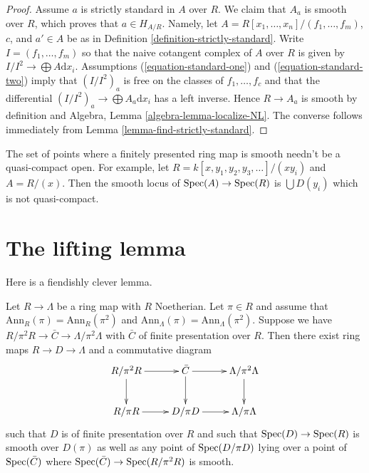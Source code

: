 \begin{proof}
Assume $a$ is strictly standard in $A$ over $R$. We claim that
$A_a$ is smooth over $R$, which proves that $a \in H_{A/R}$. Namely,
let $A = R[x_1, \ldots, x_n]/(f_1, \ldots, f_m)$, $c$, and $a' \in A$
be as in Definition \ref{definition-strictly-standard}.
Write $I = (f_1, \ldots, f_m)$ so that the naive cotangent
complex of $A$ over $R$ is given by $I/I^2 \to \bigoplus A\text{d}x_i$.
Assumptions (\ref{equation-standard-one}) and (\ref{equation-standard-two})
imply that $(I/I^2)_a$ is free on the classes of $f_1, \ldots, f_c$  
and that the differential $(I/I^2)_a \to \bigoplus A_a\text{d}x_i$
has a left inverse. Hence $R \to A_a$ is smooth by definition and
Algebra, Lemma \ref{algebra-lemma-localize-NL}. The converse
follows immediately from
Lemma \ref{lemma-find-strictly-standard}.
\end{proof}

\begin{example}
\label{example-not-quasi-compact}
The set of points where a finitely presented ring map is smooth
needn't be a quasi-compact open. For example, let
$R = k[x, y_1, y_2, y_3, \ldots]/(xy_i)$ and $A = R/(x)$.
Then the smooth locus of $\mathop{\rm Spec}(A) \to \mathop{\rm Spec}(R)$ is
$\bigcup D(y_i)$ which is not quasi-compact.
\end{example}





\section{The lifting lemma}
\label{section-lifting}

\noindent
Here is a fiendishly clever lemma.

\begin{lemma}
\label{lemma-lifting}
Let $R \to \Lambda$ be a ring map with $R$ Noetherian.
Let $\pi \in R$ and assume that
$\text{Ann}_R(\pi) = \text{Ann}_R(\pi^2)$ and
$\text{Ann}_\Lambda(\pi) = \text{Ann}_\Lambda(\pi^2)$.
Suppose we have $R/\pi^2R \to \bar C \to \Lambda/\pi^2\Lambda$
with $\bar C$ of finite presentation over $R$. Then there exist ring maps
$R \to D \to \Lambda$ and a commutative diagram
$$
\xymatrix{
R/\pi^2R \ar[r] \ar[d] &
\bar C \ar[r] \ar[d] &
\Lambda/\pi^2\Lambda \ar[d] \\
R/\pi R \ar[r] &
D/\pi D \ar[r] &
\Lambda/\pi \Lambda
}
$$
such that $D$ is of finite presentation over $R$ and such that
$\mathop{\rm Spec}(D) \to \mathop{\rm Spec}(R)$ is smooth over $D(\pi)$ as well
as any point of $\mathop{\rm Spec}(D/\pi D)$ lying over a point of $\mathop{\rm Spec}(\bar C)$
where $\mathop{\rm Spec}(\bar C) \to \mathop{\rm Spec}(R/\pi^2 R)$ is smooth.
\end{lemma}

